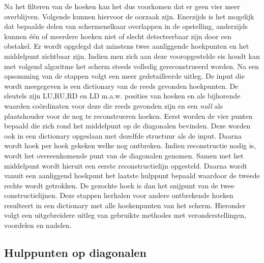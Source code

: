 
	Na het filteren van de hoeken kan het dus voorkomen dat er geen vier meer overblijven. Volgende kunnen hiervoor de oorzaak zijn. Enerzijds is het mogelijk dat bepaalde delen van schermenelkaar overlappen in de opstelling, anderzijds kunnen één of meerdere hoeken niet of slecht detecteerbaar zijn door een obstakel. Er wordt opgelegd dat minstens twee aanliggende hoekpunten en het middelpunt zichtbaar zijn. Indien men zich aan deze vooropgestelde eis houdt kan met volgend algoritme het scherm steeds volledig gereconstrueerd worden. Na een opsomming van de stappen volgt een meer gedetailleerde uitleg. \newline
	 De input die wordt meegegeven is een dictionary van de reeds gevonden hoekpunten. De sleutels zijn LU,RU,RD en LD m.a.w. posities van hoeken en als bijhorende waarden coördinaten voor deze die reeds gevonden zijn en een \textit{null} als plaatshouder voor de nog te reconstrueren hoeken. \newline
	 Eerst worden de vier punten bepaald die zich rond het middelpunt op de diagonalen bevinden. Deze worden ook in een dictionary opgeslaan met dezelfde structuur als de input. Daarna wordt hoek per hoek gekeken welke nog ontbreken. Indien reconstructie nodig is, wordt het overeenkomende punt van de diagonalen genomen. Samen met het middelpunt wordt hieruit een eerste reconstructielijn opgesteld. Daarna wordt vanuit een aanliggend hoekpunt het laatste hulppunt bepaald waardoor de tweede rechte wordt getrokken. De gezochte hoek is dan het snijpunt van de twee constructielijnen. Deze stappen herhalen voor andere ontbrekende hoeken resulteert in een dictionary met alle hoekenpunten van het scherm. Hieronder volgt een uitgebreidere uitleg van gebruikte methodes met veronderstellingen, voordelen en nadelen.
	
	\subsection{Hulppunten op diagonalen} \label{subsec:diagonalen}
		
